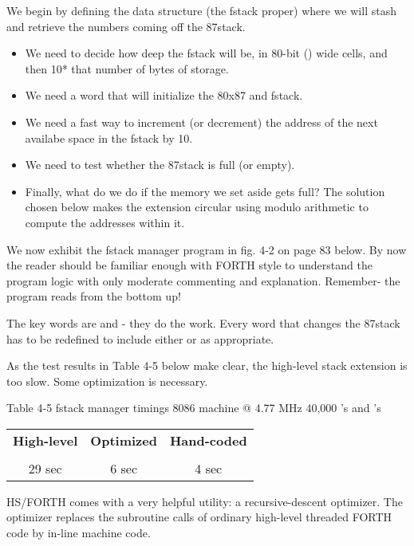 We begin by defining the data structure (the fstack proper) where we will stash and retrieve the numbers coming off the 87stack.

\begin{itemize}
    \item We need to decide how deep the fstack will be, in 80-bit () wide cells, and then  10* that number of bytes of storage.
    \item We need a word that will initialize the 80x87 and fstack.
    \item We need a fast way to increment (or decrement) the address of the next availabe space in the fstack by 10.
    \item We need to test whether the 87stack is full (or empty).
    \item Finally, what do we do if the memory we set aside gets full? The solution chosen below makes the extension circular using modulo arithmetic to compute the addresses within it.
\end{itemize}

We now exhibit the fstack manager program in fig. 4-2 on page 83 below. By now the reader should be familiar enough with FORTH style to understand the program logic with only moderate commenting and explanation. Remember- the program reads from the bottom up!

The key words are  and - they do the work. Every word that changes the 87stack has to be redefined to include either  or  as appropriate.

As the test results in Table 4-5 below make clear, the high-level stack extension is too slow. Some optimization is necessary.

Table 4-5 fstack manager timings
8086 machine @ 4.77 MHz
40,000 's and 's
\begin{center}
    \begin{tabular}{|c c c|}
    \hline
        \textbf{High-level} & \textbf{Optimized} & \textbf{Hand-coded} \\
        \\
        29 sec              & 6 sec              & 4 sec \\
    \hline
    \end{tabular}
\end{center}

HS/FORTH comes with a very helpful utility: a recursive-descent optimizer. The optimizer replaces the subroutine calls of ordinary high-level threaded FORTH code by in-line machine code.


